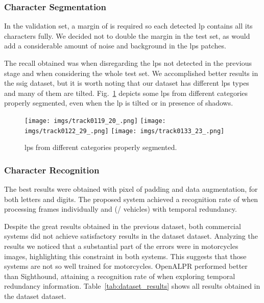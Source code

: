 \subsubsection{Character Segmentation}

In the validation set, a margin of  is required so each detected \gls*{lp} contains all its characters fully. We decided not to double the margin in the test set, as  would add a considerable amount of noise and background in the \glspl*{lp} patches.

The recall obtained was  when disregarding the \glspl*{lp} not detected in the previous stage and  when considering the whole test set. We accomplished better results in the \gls*{ssig} dataset, but it is worth noting that our dataset has different \glspl*{lp} types and many of them are tilted.
Fig.~\ref{fig:dataset_cs_samples} depicts some \glspl*{lp} from different categories properly segmented, even when the \gls*{lp} is tilted or in presence of shadows.

\begin{figure}[!htb]
	\centering
	\texttt{[image: imgs/track0119\_20\_.png]}
	\texttt{[image: imgs/track0122\_29\_.png]}
	\texttt{[image: imgs/track0133\_23\_.png]}
	\caption{\glspl*{lp} from different categories properly segmented.}
	\label{fig:dataset_cs_samples}    
\end{figure}

\subsubsection{Character Recognition}

The best results were obtained with  pixel of padding and data augmentation, for both letters and digits. The proposed system achieved a recognition rate of  when processing frames individually and  (/ vehicles) with temporal redundancy. 

Despite the great results obtained in the previous dataset, both commercial systems did not achieve satisfactory results in the \acrshort*{dataset} dataset. 
Analyzing the results we noticed that a substantial part of the errors were in motorcycles images, highlighting this constraint in both systems.
This suggests that those systems are not so well trained for motorcycles.
OpenALPR performed better than Sighthound, attaining a recognition rate of  when exploring temporal redundancy information. Table~\ref{tab:dataset_results} shows all results obtained in the \gls*{dataset} dataset.

